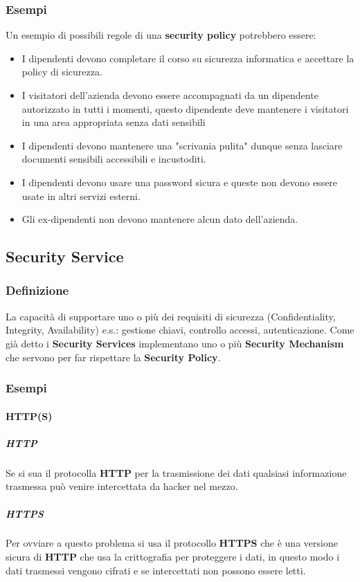             \subsubsection{Esempi}
                Un esempio di possibili regole di una \textbf{security policy} potrebbero essere:
                \begin{itemize}
                    \item I dipendenti devono completare il corso su sicurezza informatica e accettare la policy di sicurezza.
                    \item I visitatori dell'azienda devono essere accompagnati da un dipendente autorizzato in tutti i momenti, questo dipendente deve mantenere i visitatori in una area appropriata senza dati sensibili
                    \item I dipendenti devono mantenere una "scrivania pulita" dunque senza lasciare documenti sensibili accessibili e incustoditi.
                    \item I dipendenti devono usare una password sicura e queste non devono essere usate in altri servizi esterni.
                    \item Gli ex-dipendenti non devono mantenere alcun dato dell'azienda.
                \end{itemize}
    \subsection{Security Service}
            \subsubsection{Definizione} La capacità di supportare uno o più dei requisiti di sicurezza (Confidentiality, Integrity, Availability) e.s.: gestione chiavi, controllo accessi, autenticazione.
                Come già detto i \textbf{Security Services} implementano uno o più \textbf{Security Mechanism} che servono per far rispettare la \textbf{Security Policy}.
            \subsubsection{Esempi}
                \paragraph{HTTP(S)}
                    \subparagraph{HTTP} Se si sua il protocolla \textbf{HTTP} per la trasmissione dei dati qualsiasi informazione trasmessa può venire intercettata da hacker nel mezzo.
                    \subparagraph{HTTPS} Per ovviare a questo problema si usa il protocollo \textbf{HTTPS} che è una versione sicura di \textbf{HTTP} che usa la crittografia per proteggere i dati, in questo modo i dati trasmessi vengono cifrati e se intercettati non possono essere letti.

